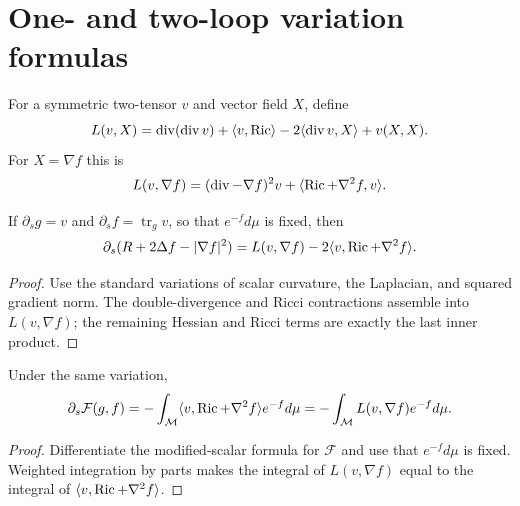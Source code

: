 \section{One- and two-loop variation formulas}

\begin{definition}
\label{def:chow-iii-ch17-linear-trace-harnack}
For a symmetric two-tensor $v$ and vector field $X$, define
\[
 L(v,X)=\operatorname{div}(\operatorname{div}v)+\langle v,\operatorname{Ric}\rangle
 -2\langle\operatorname{div}v,X\rangle+v(X,X).
\]
For $X=\nabla f$ this is
\[
 L(v,\nabla f)=(\operatorname{div}-\nabla f)^2v
 +\langle\operatorname{Ric}+\nabla^2f,v\rangle.
\]
\end{definition}

\begin{lemma}
\label{lem:chow-iii-ch17-modified-scalar-variation}
If $\partial_sg=v$ and $\partial_sf=\operatorname{tr}_gv$, so that
$e^{-f}d\mu$ is fixed, then
\[
 \partial_s(R+2\Delta f-|\nabla f|^2)
 =L(v,\nabla f)-2\langle v,\operatorname{Ric}+\nabla^2f\rangle.
\]
\end{lemma}
\begin{proof}
Use the standard variations of scalar curvature, the Laplacian, and squared
gradient norm.  The double-divergence and Ricci contractions assemble into
$L(v,\nabla f)$; the remaining Hessian and Ricci terms are exactly the last
inner product.
\end{proof}

\begin{lemma}
\label{lem:chow-iii-ch17-perelman-energy-first-variation}
Under the same variation,
\[
 \partial_s\mathcal F(g,f)=-\int_{\mathcal M}
 \langle v,\Ric+\nabla^2f\rangle e^{-f}d\mu
 =-\int_{\mathcal M}L(v,\nabla f)e^{-f}d\mu.
\]
\end{lemma}
\begin{proof}
Differentiate the modified-scalar formula for $\mathcal F$ and use that
$e^{-f}d\mu$ is fixed.  Weighted integration by parts makes the integral of
$L(v,\nabla f)$ equal to the integral of
$\langle v,\operatorname{Ric}+\nabla^2f\rangle$.
\end{proof}


